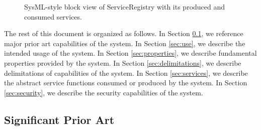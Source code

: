 \documentclass[a4paper]{arrowhead}
\begin{document}
\begin{figure}[ht!]
  \centering
  \caption{SysML-style block view of ServiceRegistry with its produced and consumed services.}
  \label{fig:system}
\end{figure}

The rest of this document is organized as follows.
In Section \ref{sec:prior_art}, we reference major prior art capabilities of the system.
In Section \ref{sec:use}, we describe the intended usage of the system.
In Section \ref{sec:properties}, we describe fundamental properties provided by the system.
In Section \ref{sec:delimitations}, we describe delimitations of capabilities of the system.
In Section \ref{sec:services}, we describe the abstract service functions consumed or produced by the system.
In Section \ref{sec:security}, we describe the security capabilities of the system.

\newpage

\subsection{Significant Prior Art}
\label{sec:prior_art}
\end{document}
